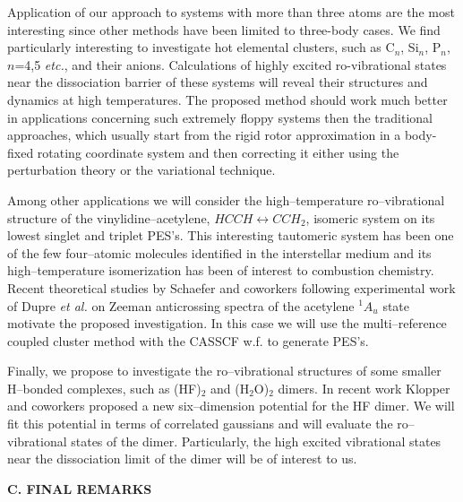 Application of our approach to systems with more than three
atoms are the most interesting since 
other methods have been limited to three-body cases.
We find particularly interesting to investigate
hot elemental clusters, such as
C$_n$, Si$_n$, P$_n$, $n$=4,5 {\it etc.}, and their anions.
Calculations of highly excited ro-vibrational states near the
dissociation barrier of
these systems will reveal their structures and dynamics 
at high temperatures.
The proposed method should work much better in
applications concerning such extremely floppy systems
then the traditional approaches, which usually start 
from the rigid rotor approximation in a body-fixed rotating 
coordinate system and then correcting it either using the
perturbation theory or the variational technique.

Among other applications we will consider
the high--temperature
ro--vibrational structure  
of the vinylidine--acetylene,
$HCCH \leftrightarrow CCH_2$, isomeric system
on its lowest singlet and triplet PES's. 
This interesting tautomeric system has been one of the few
four--atomic molecules identified in the interstellar medium
and its high--temperature isomerization has been of interest
to combustion chemistry. 
Recent theoretical
studies by Schaefer and coworkers \cite{ref:sch1,ref:sch2}
following experimental work of Dupre {\it et al.} \cite{ref:dup1}
on Zeeman anticrossing spectra of the acetylene $^{1}A_u$
state motivate the proposed investigation.
In this case we will use the
multi--reference coupled cluster method with the CASSCF
w.f. to generate PES's.

Finally, we propose to investigate the ro--vibrational
structures of some smaller H--bonded complexes, such as
(HF)$_2$ and (H$_2$O)$_2$ dimers. In recent work Klopper and
coworkers \cite{klopper} proposed a new six--dimension potential
for the HF dimer. We will fit this potential in terms of
correlated gaussians and will evaluate the ro--vibrational states
of the dimer. Particularly, the high excited vibrational states
near the dissociation limit of the dimer will be 
of interest to us.

\newpage

\vspace{2mm}
\noindent
{\bf C. FINAL REMARKS}


